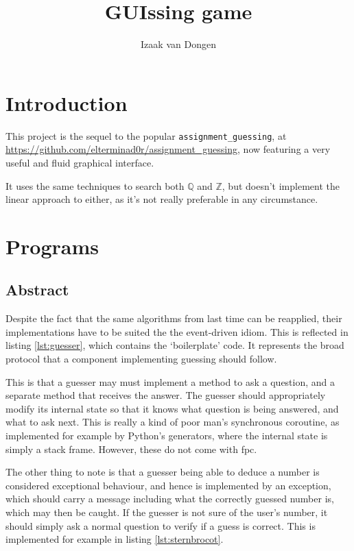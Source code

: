 \documentclass[a4paper,11pt]{article}
\title{GUIssing game}
\author{Izaak van Dongen}
\begin{document}
    \maketitle\thispagestyle{empty} %
    \tableofcontents
    \listoflistings

    \section{Introduction}

    This project is the sequel to the popular \texttt{assignment\_guessing},
    at \url{https://github.com/elterminad0r/assignment_guessing}, now featuring
    a very useful and fluid graphical interface.

    It uses the same techniques to search both $\mathbb{Q}$ and $\mathbb{Z}$,
    but doesn't implement the linear approach to either, as it's not really
    preferable in any circumstance.

    \section{Programs}

    \subsection{Abstract}

    Despite the fact that the same algorithms from last time can be reapplied,
    their implementations have to be suited the the event-driven idiom. This is
    reflected in listing \ref{lst:guesser}, which contains the `boilerplate'
    code. It represents the broad protocol that a component implementing
    guessing should follow.

    This is that a guesser may must implement a method to ask a question, and a
    separate method that receives the answer. The guesser should appropriately
    modify its internal state so that it knows what question is being answered,
    and what to ask next. This is really a kind of poor man's synchronous
    coroutine, as implemented for example by Python's generators, where the
    internal state is simply a stack frame. However, these do not come with fpc.

    The other thing to note is that a guesser being able to deduce a number is
    considered exceptional behaviour, and hence is implemented by an exception,
    which should carry a message including what the correctly guessed number is,
    which may then be caught. If the guesser is not sure of the user's number,
    it should simply ask a normal question to verify if a guess is correct. This
    is implemented for example in listing \ref{lst:sternbrocot}.
\end{document}
